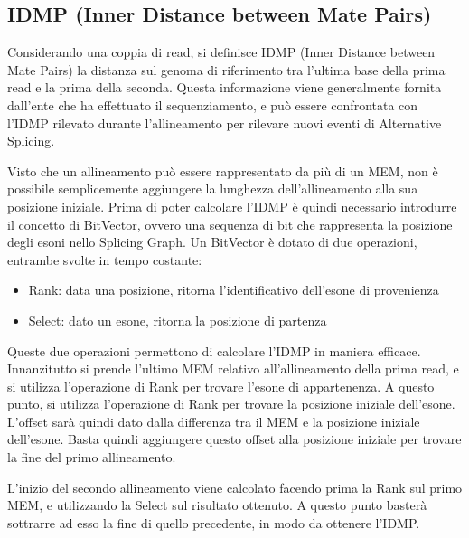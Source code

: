 
\newpage

\subsection{IDMP (Inner Distance between Mate Pairs)}
Considerando una coppia di read, si definisce IDMP (Inner Distance between Mate Pairs) la distanza sul genoma di riferimento tra l'ultima base della prima read e la prima della seconda. Questa informazione viene generalmente fornita dall'ente che ha effettuato il sequenziamento, e può essere confrontata con l'IDMP rilevato durante l'allineamento per rilevare nuovi eventi di Alternative Splicing.

Visto che un allineamento può essere rappresentato da più di un MEM, non è possibile semplicemente aggiungere la lunghezza dell'allineamento alla sua posizione iniziale. Prima di poter calcolare l'IDMP è quindi necessario introdurre il concetto di BitVector, ovvero una sequenza di bit che rappresenta la posizione degli esoni nello Splicing Graph. Un BitVector è dotato di due operazioni, entrambe svolte in tempo costante:

\begin{itemize}
	\item Rank: data una posizione, ritorna l'identificativo dell'esone di provenienza
	\item Select: dato un esone, ritorna la posizione di partenza 
\end{itemize}

Queste due operazioni permettono di calcolare l'IDMP in maniera efficace. Innanzitutto si prende l'ultimo MEM relativo all'allineamento della prima read, e si utilizza l'operazione di Rank per trovare l'esone di appartenenza. A questo punto, si utilizza l'operazione di Rank per trovare la posizione iniziale dell'esone. L'offset sarà quindi dato dalla differenza tra il MEM e la posizione iniziale dell'esone. Basta quindi aggiungere questo offset alla posizione iniziale per trovare la fine del primo allineamento.

L'inizio del secondo allineamento viene calcolato facendo prima la Rank sul primo MEM, e utilizzando la Select sul risultato ottenuto. A questo punto basterà sottrarre ad esso la fine di quello precedente, in modo da ottenere l'IDMP.

